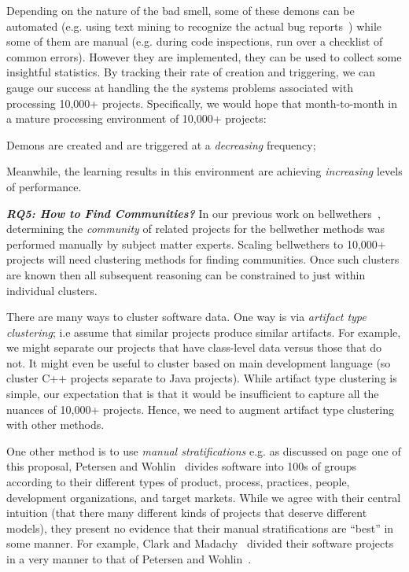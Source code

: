 Depending on the nature of the bad smell, some of these demons can be automated (e.g. using text mining to recognize
the actual bug reports~\cite{Yu18q}) while some of them are manual
(e.g. during code inspections, run over a checklist of common errors). 
However they are implemented, they can be used
to collect some insightful  statistics.
By tracking their rate
of creation and triggering, we can gauge our success at handling the the systems problems associated with processing 10,000+ projects. Specifically, we would hope that month-to-month in a  mature
processing environment of 10,000+ projects:
\bi
\item
 Demons are created and are triggered at a {\em decreasing} frequency;
 \item
 Meanwhile, the learning results in this environment are achieving {\em increasing}
 levels of performance.
 \ei

 

 

 
\textit{\textbf{RQ5: How to Find Communities?}} In our previous
work on bellwethers~\cite{KrishnaMF16,krishna2018bellwethers},  determining the {\em community} of related projects for the bellwether methods was performed manually by   subject matter experts. Scaling bellwethers to 10,000+ projects will need  clustering methods for finding  communities. Once such clusters are known then all subsequent reasoning can be constrained to just within individual clusters.

There are many ways to cluster software data.
One way is via {\em artifact type clustering}; i.e assume that similar projects produce similar artifacts. For example, we might separate our projects that have class-level data  versus those that do not.
It might even be useful to cluster based on main development language (so cluster C++ projects separate to Java projects).
While artifact type clustering is simple, our expectation that is that it would be insufficient to capture all the nuances of 10,000+ projects.
Hence, we need to augment artifact type clustering with other methods. 

One other method  is to use 
{\em manual stratifications} e.g. as discussed on page one of this proposal,
Petersen and Wohlin~\cite{Petersen2009} divides software into 100s of groups according to their different types of product, process, practices, people, development organizations, and target markets. While we agree
with their central intuition (that there many different kinds of projects that deserve different models), they present no evidence that their manual stratifications are ``best'' in some manner.
For example, 
Clark and Madachy~\cite{clark15} divided their software projects in a very manner to
that of  Petersen and Wohlin~\cite{Petersen2009}.

